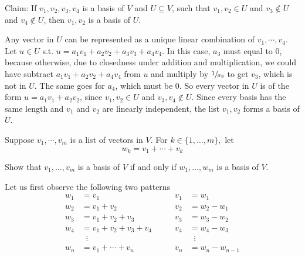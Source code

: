 \begin{xrcs}
  Claim: If $v_1, v_2, v_3, v_4$ is a basis of $V$ and $U \subseteq V$, such that $v_1, v_2 \in U$ and $v_3 \notin U$ and $v_4 \notin U$, then $v_1, v_2$ is a basis of $U$.
\end{xrcs}
\begin{prf}
  Any vector in $U$ can be represented as a unique linear combination of $v_1, \cdots, v_4$. Let $u\in U$ s.t. $u=a_1 v_1 + a_2 v_2 + a_3 v_3 + a_4 v_4$. In this case, $a_3$ must equal to $0$, because otherwise, due to closedness under addition and multiplication, we could have subtract $a_1 v_1 + a_2 v_2+a_4v_4$ from $u$ and multiply by $\sfrac{1}{a_3}$ to get $v_3$, which is not in $U$. The same goes for $a_4$, which must be $0$. So every vector in $U$ is of the form $u=a_1 v_1 + a_2 v_2$, since $v_1, v_2 \in U$ and $v_3, v_4 \notin U$. Since every basis has the same length and $v_1$ and $v_2$ are linearly independent, the list $v_1, v_2$ forms a basis of $U$.
\end{prf}

\begin{xrcs}
  Suppose $v_1, \cdots, v_m$ is a list of vectors in $V$. For $k \in \{1, \ldots, m\},$ let
  \begin{equation}
    w_k = v_1 + \cdots + v_k
  \end{equation}
  
  Show that $v_1, \ldots, v_m$ is a basis of $V$ if and only if $w_1, \ldots, w_m$ is a basis of $V$.
\end{xrcs}
\begin{prf}
  Let us first observe the following two patterns
  \begin{equation}
    \begin{aligned}
      w_1 &= v_1                    & \qquad v_1 &= w_1       \\
      w_2 &= v_1 + v_2              & \qquad v_2 &= w_2 - w_1 \\
      w_3 &= v_1 + v_2 + v_3        & \qquad v_3 &= w_3 - w_2 \\
      w_4 &= v_1 + v_2 + v_3 + v_4  & \qquad v_4 &= w_4 - w_3 \\
          &\;\;\vdots               &            &\;\;\vdots \\
      w_n &= v_1 + \cdots + v_n     & \qquad v_n &= w_n - w_{n-1}
    \end{aligned}
  \end{equation}
\end{prf}
